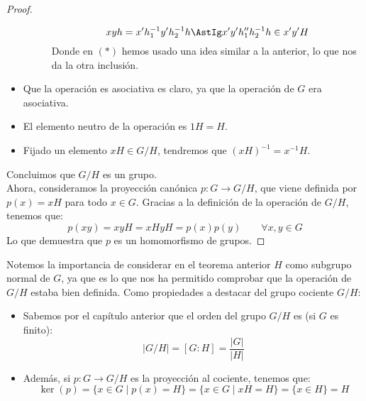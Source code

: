 \begin{teo}
\begin{proof}
\begin{itemize}
\begin{description}
\begin{equation*}
                            xyh = x'h_1^{-1}y'h_2^{-1}h \AstIg x'y'h_1''h_2^{-1}h \in x'y'H
                        \end{equation*}
                        Donde en $(\ast)$ hemos usado una idea similar a la anterior, lo que nos da la otra inclusión.
                \end{description}
            \item Que la operación es asociativa es claro, ya que la operación de $G$ era asociativa.
            \item El elemento neutro de la operación es $1H = H$.
            \item Fijado un elemento $xH \in G/H$, tendremos que ${(xH)}^{-1} = x^{-1}H$.
        \end{itemize}
        Concluimos que $G/H$ es un grupo.\\

        \noindent
        Ahora, consideramos la proyección canónica $p:G\rightarrow G/H$, que viene definida por $p(x) = xH$ para todo $x\in G$. Gracias a la definición de la operación de $G/H$, tenemos que:
        \begin{equation*}
            p(xy) = xyH = xHyH = p(x)p(y) \qquad \forall x,y\in G
        \end{equation*}
        Lo que demuestra que $p$ es un homomorfismo de grupos.
    \end{proof}
\end{teo}

\noindent
Notemos la importancia de considerar en el teorema anterior $H$ como subgrupo normal de $G$, ya que es lo que nos ha permitido comprobar que la operación de $G/H$ estaba bien definida. Como propiedades a destacar del grupo cociente $G/H$:

\begin{itemize}
    \item Sabemos por el capítulo anterior que el orden del grupo $G/H$ es (si $G$ es finito):
        \begin{equation*}
            |G/H| = [G:H] = \dfrac{|G|}{|H|}
        \end{equation*}
    \item Además, si $p:G\to G/H$ es la proyección al cociente, tenemos que:
        \begin{equation*}
            \ker(p) = \{x\in G\mid p(x) = H\} = \{x\in G\mid xH = H\} = \{x\in H\} = H
        \end{equation*}
\end{itemize}

